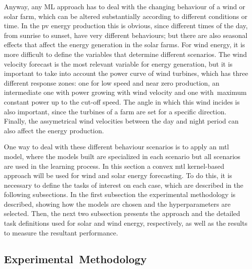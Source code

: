 Anyway, any ML approach has to deal with the changing behaviour of a wind or solar farm, which can be altered substantially according to different conditions or time.
In the \acrfull{pv} energy production this is obvious, since different times of the day, from sunrise to sunset, have very different behaviours; but there are also seasonal effects that affect the energy generation in the solar farms.
For wind energy, it is more difficult to define the variables that determine different scenarios. 
The wind velocity forecast is the most relevant variable for energy generation, but it is important to take into account the power curve of wind turbines, which has three different response zones: one for low speed and near zero production, an intermediate one with power growing with wind velocity and one with~maximum constant power up to the cut-off speed.
The angle in which this wind incides is also important, since the turbines of a farm are set for a specific direction. 
Finally, the assymetrical wind velocities between the day and night period can also affect the energy production.

One way to deal with these different behaviour scenarios is to apply an \acrshort{mtl} model, where the models built are specialized in each scenario but all scenarios are used in the learning process.
In this section a convex \acrshort{mtl} kernel-based approach will be used for wind and solar energy forecasting. To do this, it is necessary to define the tasks of interest on each case, which are described in the following subsections.
In the first subsection the experimental methodology is described, showing how the models are chosen and the hyperparameters are selected. Then, the next two subsection presents the approach and the detailed task definitions used for solar and wind energy, respectively, as well as the results to measure the resultant performance.

\subsection{Experimental~Methodology\\}

